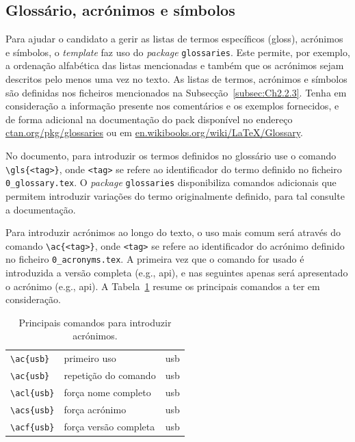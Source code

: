 
\subsection{Glossário, acrónimos e símbolos}

Para ajudar o candidato a gerir as listas de termos específicos (\gls{gloss}), acrónimos e símbolos, o \textit{template} faz uso do \textit{package} \verb|glossaries|. Este permite, por exemplo, a ordenação alfabética das listas mencionadas e também que os acrónimos sejam descritos pelo menos uma vez no texto. As listas de termos, acrónimos e símbolos são definidas nos ficheiros mencionados na Subsecção~\ref{subsec:Ch2.2.3}. Tenha em consideração a informação presente nos comentários e os exemplos fornecidos, e de forma adicional na documentação do \gls{pack} disponível no endereço \url{ctan.org/pkg/glossaries} ou em \url{en.wikibooks.org/wiki/LaTeX/Glossary}.

No documento, para introduzir os termos definidos no glossário use o comando \verb|\gls{<tag>}|, onde \verb|<tag>| se refere ao identificador do termo definido no ficheiro \verb|0_glossary.tex|. O \textit{package} \verb|glossaries| disponibiliza comandos adicionais que permitem introduzir variações do termo originalmente definido, para tal consulte a documentação.

Para introduzir acrónimos ao longo do texto, o uso mais comum será através do comando \verb|\ac{<tag>}|, onde \verb|<tag>| se refere ao identificador do acrónimo definido no ficheiro \verb|0_acronyms.tex|. A primeira vez que o comando for usado é introduzida a versão completa (e.g., \ac{api}), e nas seguintes apenas será apresentado o acrónimo (e.g., \ac{api}). A Tabela~\ref{tab:acros} resume os principais comandos a ter em consideração. 

\begin{table}[htb]
	\caption{Principais comandos para introduzir acrónimos.}
	\label{tab:acros}
	\centering
	\begin{tabular}{l l l}
	\toprule
	\tabhead{Comando} & \tabhead{} & \tabhead{Resultado} \\
	\midrule
		\verb|\ac{usb}| & primeiro uso & \ac{usb}\\
		\verb|\ac{usb}| & repetição do comando & \ac{usb}\\
		\verb|\acl{usb}| & força nome completo & \acl{usb}\\
		\verb|\acs{usb}| & força acrónimo & \acs{usb}\\
		\verb|\acf{usb}| & força versão completa & \acf{usb}\\
	\bottomrule
	\end{tabular}
\end{table}

